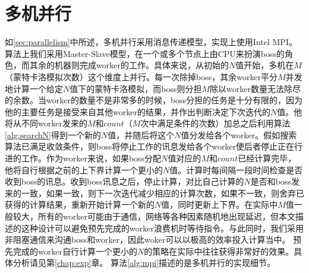 \section{多机并行}
\label{sec:mpi}
如\ref{sec:parallelism}中所述，多机并行采用消息传递模型，实现上使用Intel MPI。算法上我们采用Master-Slave模型，在一个或多个节点上由CPU来扮演boss的角色，而其余的机器则完成worker的工作。具体来说，从初始的$N$值开始，多机在$M$（蒙特卡洛模拟次数）这个维度上并行。每一次除掉boss，其余worker平分$M$并发地计算一个给定$N$值下的蒙特卡洛模拟，而boss则分担$M$除以worker数量无法除尽的余数。当worker的数量不是非常多的时候，boss分担的任务是十分有限的，因为他的主要任务是接受来自其他worker的结果，并作出判断决定下次迭代的$N$值。他将从不同worker发来的$M$和$count$（$M$次中满足条件的次数）加总之后利用算法\ref{alg:searchN}得到一个新的$N$值，并随后将这个$N$值分发给各个worker。假如搜索算法已满足收敛条件，则boss将停止工作的讯息发给各个worker使后者停止正在行进的工作。作为worker来说，如果boss分配$N$值对应的$M$和$count$已经计算完毕，他将自行根据之前的上下界计算一个更小的$N$值。计算时每间隔一段时间检查是否收到boss的讯息。收到boss讯息之后，停止计算，对比自己计算的$N$是否和boss发来的一致，如果一致，则下一次迭代减少相应的计算次数，如果不一致，则舍弃已获得的计算结果，重新开始计算一个新的$N$值，同时更新上下界。在实际中$M$值一般较大，所有的worker可能由于通信，网络等各种因素随机地出现延迟，但本文描述的这种设计可以避免预先完成的worker浪费机时等待指令。与此同时，我们采用非阻塞通信来沟通boss和worker，因此woker可以以极高的效率投入计算当中。
预先完成的worker自行计算一个更小的$N$的策略在实际中往往获得非常好的效果。具体分析请见第\ref{chap:exp}章。
算法\ref{alg:mpi}描述的是多机并行的实现细节。
